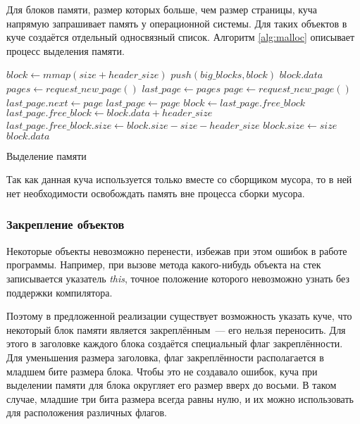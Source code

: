 Для блоков памяти, размер которых больше, чем размер страницы, куча напрямую запрашивает память у операционной системы. Для таких объектов в куче создаётся отдельный односвязный список.
Алгоритм \ref{alg:malloc} описывает процесс выделения памяти. 

\begin{algorithm}[h]
\begin{algorithmic}[1]
    \State $block \gets mmap(size + header\_size)$
    \State $push(big\_blocks, block)$
    \State \Return $block.data$
\EndIf
{}
    \State $pages \gets request\_new\_page()$
    \State $last\_page \gets pages$
\EndIf
{}
    \State $page \gets request\_new\_page()$
    \State $last\_page.next \gets page$
    \State $last\_page \gets page$
\EndIf
\State $block \gets last\_page.free\_block$
\State $last\_page.free\_block \gets block.data + header\_size$
\State $last\_page.free\_block.size \gets block.size - size - header\_size$
\State $block.size \gets size$
\State \Return $block.data$
\end{algorithmic}
\caption{Выделение памяти}\label{alg:malloc}
\end{algorithm}

Так как данная куча используется только вместе со сборщиком мусора, то в ней нет необходимости освобождать память вне процесса сборки мусора.

\subsubsection{Закрепление объектов}
Некоторые объекты невозможно перенести, избежав при этом ошибок в работе программы. Например, при вызове метода какого-нибудь объекта на стек записывается указатель \textit{this}, точное положение которого невозможно узнать без поддержки компилятора.

Поэтому в предложенной реализации существует возможность указать куче, что некоторый блок памяти является закреплённым~--- его нельзя переносить.
Для этого в заголовке каждого блока создаётся специальный флаг закреплённости.
Для уменьшения размера заголовка, флаг закреплённости располагается в младшем бите размера блока. Чтобы это не создавало ошибок, куча при выделении памяти для блока округляет его размер вверх до восьми. В таком случае, младшие три бита размера всегда равны нулю, и их можно использовать для расположения различных флагов.
